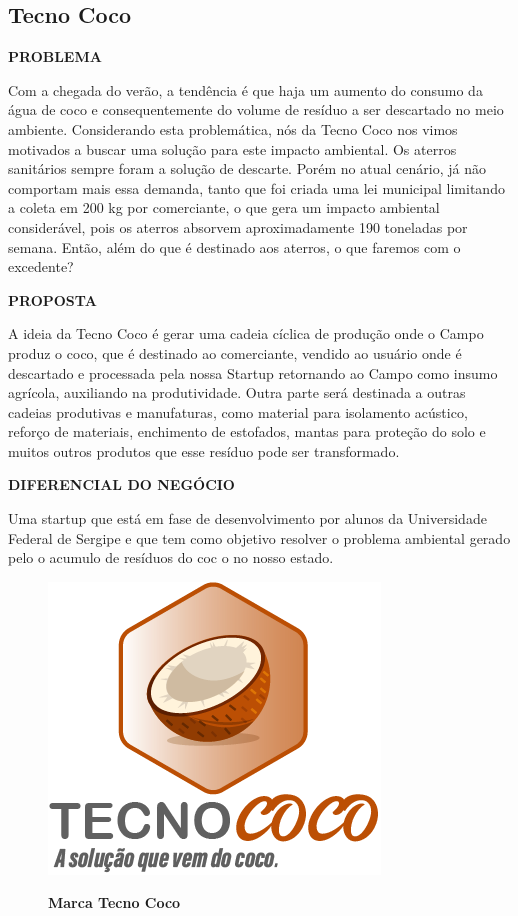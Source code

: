 \subsection{Tecno Coco}

\textbf{PROBLEMA}

Com a chegada do verão, a tendência é que haja um aumento do consumo da água de coco e consequentemente do volume de resíduo a ser descartado no meio ambiente. Considerando esta problemática, nós da Tecno Coco nos vimos motivados a buscar uma solução para este impacto ambiental. Os aterros sanitários sempre foram a solução de descarte. Porém no atual cenário, já não comportam mais essa demanda, tanto que foi criada uma lei municipal limitando a coleta em 200 kg por comerciante, o que gera um impacto ambiental considerável, pois os aterros absorvem aproximadamente 190 toneladas por semana. Então, além do que é destinado aos aterros, o que faremos com o excedente?

\textbf{PROPOSTA}

A ideia da Tecno Coco é gerar uma cadeia cíclica de produção onde o Campo produz o coco, que é destinado ao comerciante, vendido ao usuário onde é descartado e processada pela nossa Startup retornando ao Campo como insumo agrícola, auxiliando na produtividade. Outra parte será destinada a outras cadeias produtivas e manufaturas, como material para isolamento acústico, reforço de materiais, enchimento de estofados, mantas para proteção do solo e muitos outros produtos que esse resíduo pode ser transformado.

\textbf{DIFERENCIAL DO NEGÓCIO}

Uma startup que está em fase de desenvolvimento por alunos da Universidade Federal de Sergipe e que tem como objetivo resolver o problema ambiental gerado pelo o acumulo de resíduos do coc o no nosso estado.

\begin{figure}[!htb]
\centering
\caption{\textbf{Marca Tecno Coco}}
\includegraphics[scale=2.0]{Imagens/tecnococo.png}
\label{figura_27}
\end{figure}
\newpage


